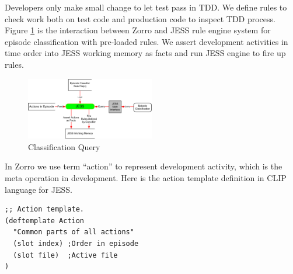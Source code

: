 \documentclass[11pt,twocolumn]{article}
\begin{document}
Developers only make small change to let test pass in TDD. We define rules
to check work both on test code and production code to inspect TDD process.
Figure \ref{fig:Query} is the interaction between Zorro and JESS rule
engine system for episode classification with pre-loaded rules. We assert
development activities in time order into JESS working memory as facts and
run JESS engine to fire up rules. 

\begin{figure}[ht] 
  \centering
  \includegraphics[width=0.5\textwidth]{picture/Query.eps}
  \caption{Classification Query}\label{fig:Query}
\end{figure} 

In Zorro we use term ``action'' to represent development activity, which is
the meta operation in development. Here is the action template definition
in CLIP language for JESS.
\begin{verbatim}
;; Action template.
(deftemplate Action
  "Common parts of all actions"
  (slot index) ;Order in episode
  (slot file)  ;Active file
)
\end{verbatim}
\end{document}
